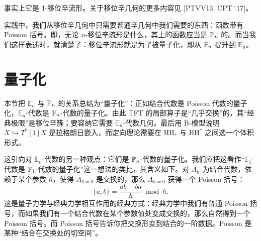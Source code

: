 事实上它是 1-移位辛流形。关于移位辛几何的更多内容见 [PTVV13, CPT$^+$17]。

实践中，我们从移位辛几何中只需要普通辛几何中我们需要的东西：函数带有 Poisson 括号。即，无论 $n$-移位辛流形是什么，其上的函数应当是 $\mathbb{P}_n$ 的。而当我们这样表述时，就清楚了：移位辛流形就是为了被量子化，即从 $\mathbb{P}_n$ 提升到 $\mathbb{E}_n$。

\section{量子化}\label{sec:14-3}

\begin{sectionkey}
本节把 $\mathbb{E}_n$ 与 $\mathbb{P}_n$ 的关系总结为“量子化”：正如结合代数是 Poisson 代数的量子化，$\mathbb{E}_n$-代数是 $\mathbb{P}_n$-代数的量子化。由此 TFT 的局部算子是“几乎交换”的，其“经典极限”是移位辛簇；要容纳它需要 $\mathbb{E}_n$-代数几何。最后用 B-模型说明 $X\hookrightarrow T^*[1]X$ 是拉格朗日嵌入，而定向理论需要在 $\mathrm{HH}_*$ 与 $\mathrm{HH}^*$ 之间选一个体积形式。
\end{sectionkey}

这引向对 $\mathbb{E}_n$-代数的另一种观点：它们是 $\mathbb{P}_n$-代数的量子化。我们应把这看作“$\mathbb{E}_1$-代数是 $\mathbb{P}_1$-代数的量子化”这一想法的类比，其含义如下。对 $A_\hbar$ 为结合代数，依赖于某个参数 $\hbar$，使得 $A_{\hbar=0}$ 是交换的，那么 $A_{\hbar=0}$ 获得一个 Poisson 括号：
\begin{equation}\tag{14.34}
\{a,b\}=\frac{ab-ba}{\hbar}\bmod\hbar.
\end{equation}
这是量子力学与经典力学相互作用的经典方式：经典力学中我们有普通 Poisson 括号，而如果我们有一个结合代数在某个参数值处变成交换的，那么自然得到一个 Poisson 括号。而 Poisson 括号告诉你把交换形变到结合的一阶数据。Poisson 是某种“结合在交换处的切空间”。

